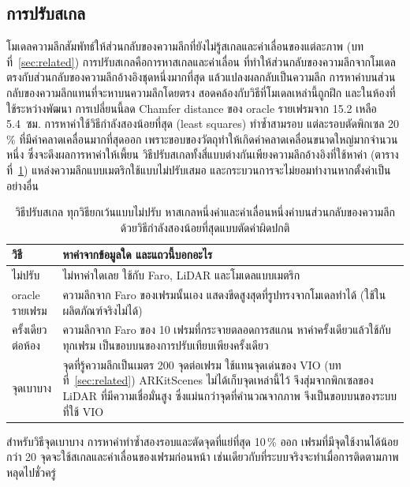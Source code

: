 \subsection{การปรับสเกล}\label{sec:align}
โมเดลความลึกสัมพัทธ์ให้ส่วนกลับของความลึกที่ยังไม่รู้สเกลและค่าเลื่อนของแต่ละภาพ (บทที่~\ref{sec:related})
การปรับสเกลคือการหาสเกลและค่าเลื่อน ที่ทำให้ส่วนกลับของความลึกจากโมเดล ตรงกับส่วนกลับของความลึกอ้างอิงชุดหนึ่งมากที่สุด
แล้วแปลงผลกลับเป็นความลึก การหาค่าบนส่วนกลับของความลึกแทนที่จะหาบนความลึกโดยตรง สอดคล้องกับวิธีที่โมเดลเหล่านี้ถูกฝึก
และในห้องที่ใช้ระหว่างพัฒนา การเปลี่ยนนี้ลด Chamfer distance ของ oracle รายเฟรมจาก 15.2 เหลือ 5.4~ซม.
การหาค่าใช้วิธีกำลังสองน้อยที่สุด (least squares) ทำซ้ำสามรอบ แต่ละรอบตัดพิกเซล 20\,\% ที่มีค่าคลาดเคลื่อนมากที่สุดออก
เพราะขอบของวัตถุทำให้เกิดค่าคลาดเคลื่อนขนาดใหญ่มากจำนวนหนึ่ง ซึ่งจะดึงผลการหาค่าให้เพี้ยน
วิธีปรับสเกลทั้งสี่แบบต่างกันเพียงความลึกอ้างอิงที่ใช้หาค่า (ตารางที่~\ref{tab:aligners})
แหล่งความลึกแบบเมตริกใช้แบบไม่ปรับเสมอ และกระบวนการจะไม่ยอมทำงานหากตั้งค่าเป็นอย่างอื่น

\begin{table}[t]
\centering\small
\caption{วิธีปรับสเกล ทุกวิธียกเว้นแบบไม่ปรับ หาสเกลหนึ่งค่าและค่าเลื่อนหนึ่งค่าบนส่วนกลับของความลึก
ด้วยวิธีกำลังสองน้อยที่สุดแบบตัดค่าผิดปกติ}
\label{tab:aligners}
\begin{tabularx}{\columnwidth}{@{}l>{\raggedright\arraybackslash}X@{}}
\toprule
วิธี & หาค่าจากข้อมูลใด และแถวนี้บอกอะไร \\
\midrule
ไม่ปรับ & ไม่หาค่าใดเลย ใช้กับ Faro, LiDAR และโมเดลแบบเมตริก \\
oracle รายเฟรม & ความลึกจาก Faro ของเฟรมนั้นเอง แสดงขีดสูงสุดที่รูปทรงจากโมเดลทำได้ (ใช้ในผลิตภัณฑ์จริงไม่ได้) \\
ครั้งเดียวต่อห้อง & ความลึกจาก Faro ของ 10 เฟรมที่กระจายตลอดการสแกน หาค่าครั้งเดียวแล้วใช้กับทุกเฟรม
เป็นขอบบนของการปรับเทียบเพียงครั้งเดียว \\
จุดเบาบาง & จุดที่รู้ความลึกเป็นเมตร 200 จุดต่อเฟรม ใช้แทนจุดเด่นของ VIO (บทที่~\ref{sec:related})
ARKitScenes ไม่ได้เก็บจุดเหล่านี้ไว้ จึงสุ่มจากพิกเซลของ LiDAR ที่มีความเชื่อมั่นสูง ซึ่งแม่นกว่าจุดที่คำนวณจากภาพ
จึงเป็นขอบบนของระบบที่ใช้ VIO \\
\bottomrule
\end{tabularx}
\end{table}

สำหรับวิธีจุดเบาบาง การหาค่าทำซ้ำสองรอบและตัดจุดที่แย่ที่สุด 10\,\% ออก
เฟรมที่มีจุดใช้งานได้น้อยกว่า 20 จุดจะใช้สเกลและค่าเลื่อนของเฟรมก่อนหน้า
เช่นเดียวกับที่ระบบจริงจะทำเมื่อการติดตามภาพหลุดไปชั่วครู่

